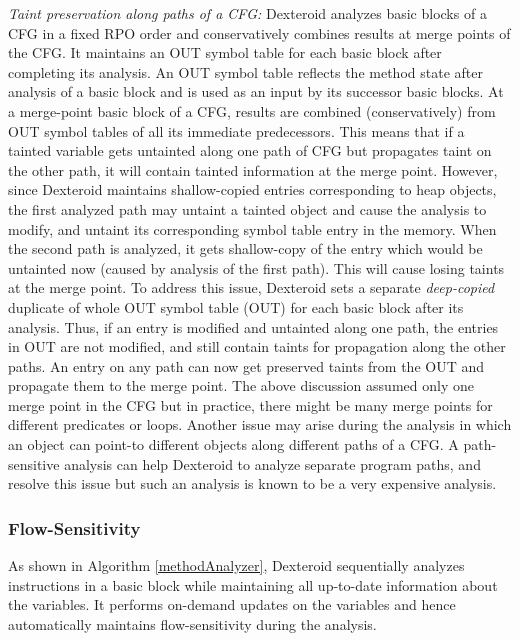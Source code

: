 \documentclass[10pt]{elsarticle}
\begin{document}
{\noindent \emph{Taint preservation along paths of a CFG:}} Dexteroid analyzes basic blocks of a CFG in a fixed RPO order and conservatively combines results at merge points of the CFG. It maintains an {\ttfamily OUT} symbol table for each basic block after completing its analysis. An {\ttfamily OUT} symbol table reflects the method state after analysis of a basic block and is used as an input by its successor basic blocks. At a merge-point basic block of a CFG, results are combined (conservatively) from {\ttfamily OUT} symbol tables of all its immediate predecessors. This means that if a tainted variable gets untainted along one path of CFG but propagates taint on the other path, it will contain tainted information at the merge point. However, since Dexteroid maintains shallow-copied entries corresponding to heap objects, the first analyzed path may untaint a tainted object and cause the analysis to modify, and untaint its corresponding symbol table entry in the memory. When the second path is analyzed, it gets shallow-copy of the entry which would be untainted now (caused by analysis of the first path). This will cause losing taints at the merge point. To address this issue, Dexteroid sets a separate \emph{deep-copied} duplicate of whole {\ttfamily OUT} symbol table ({\ttfamily OUT}) for each basic block after its analysis. Thus, if an entry is modified and untainted along one path, the entries in {\ttfamily OUT} are not modified, and still contain taints for propagation along the other paths. An entry on any path can now get preserved taints from the {\ttfamily OUT} and propagate them to the merge point. The above discussion assumed only one merge point in the CFG but in practice, there might be many merge points for different predicates or loops. Another issue may arise during the analysis in which an object can point-to different objects along different paths of a CFG. A path-sensitive analysis can help Dexteroid to analyze separate program paths, and resolve this issue but such an analysis is known to be a very expensive analysis. 

\subsubsection{Flow-Sensitivity} 

As shown in Algorithm \ref{methodAnalyzer}, Dexteroid sequentially analyzes instructions in a basic block while maintaining all up-to-date information about the variables. It performs on-demand updates on the variables and hence automatically maintains flow-sensitivity during the analysis.
\end{document}
